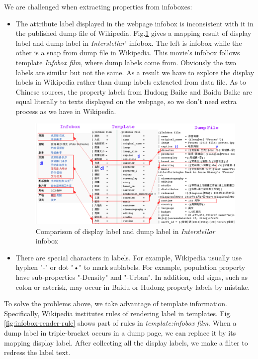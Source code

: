 \documentclass[runningheads,a4paper]{llncs}
\begin{document}
We are challenged when extracting properties from infoboxes:
\begin{itemize}
    \item The attribute label displayed in the webpage infobox is inconsistent with it in the published dump file of Wikipedia. Fig.\ref{fig:infobox-template} gives a mapping result of display label and dump label in \emph{Interstellar}' infobox. The left is infobox while the other is a snap from dump file in Wikipedia. This movie's infobox follows template \emph{Infobox film}, where dump labels come from. Obviously the two labels are similar but not the same. As a result we have to explore the display labels in Wikipedia rather than dump labels extracted from data file. As to Chinese sources, the property labels from Hudong Baike and Baidu Baike are equal literally to texts displayed on the webpage, so we don't need extra process as we have in Wikipedia.
    \begin{figure}[ht]
        \centerline{\includegraphics[width=1\columnwidth]{fig/infobox-template}}
        \label{fig:infobox-template}
        \caption{Comparison of display label and dump label in \emph{Interstellar} infobox}
    \end{figure}%
    \item There are special characters in labels. For example, Wikipedia usually use hyphen "-" or dot "•" to mark sublabels. For example, population property have sub-properties "-Density" and "-Urban". In addition, odd signs, such as colon or asterisk, may occur in Baidu or Hudong property labels by mistake.
\end{itemize}

To solve the problems above, we take advantage of template information. Specifically, Wikipedia institutes rules of rendering label in templates. Fig.\ref{fig:infobox-render-rule} shows part of rules in \emph{template:infobox film}. When a dump label in triple-bracket occurs in a dump page, we can replace it by its mapping display label. After collecting all the display labels, we make a filter to redress the label text.
\end{document}

